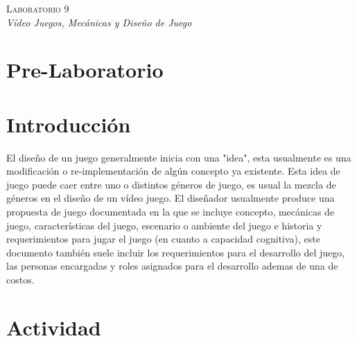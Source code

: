 \begin{center}
\textsc{\Large Laboratorio 9}~\\
\emph{\large Vídeo Juegos, Mecánicas y Diseño de Juego}
\end{center}

\section{Pre-Laboratorio}

\section{Introducción}
El diseño de un juego generalmente inicia con una "idea", esta usualmente es una modificación o re-implementación de algún concepto ya existente. Esta idea de juego puede caer entre uno o distintos géneros de juego, es usual la mezcla de géneros en el diseño de un vídeo juego. El diseñador usualmente produce una propuesta de juego documentada en la que se incluye concepto, mecánicas de juego, características del juego, escenario o ambiente del juego e historia y requerimientos para jugar el juego (en cuanto a capacidad cognitiva), este documento también suele incluir los requerimientos para el desarrollo del juego, las personas encargadas y roles asignados para el desarrollo ademas de una  de costos. 

\section{Actividad}

